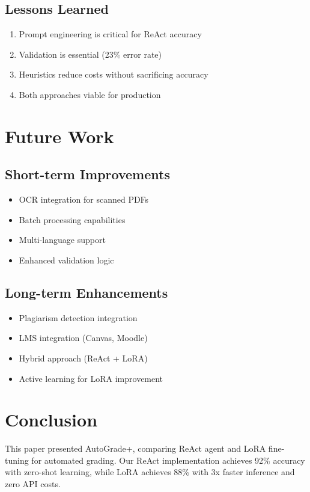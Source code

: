 \documentclass[runningheads]{llncs}
\begin{document}
\subsection{Lessons Learned}

\begin{enumerate}
    \item Prompt engineering is critical for ReAct accuracy
    \item Validation is essential (23\% error rate)
    \item Heuristics reduce costs without sacrificing accuracy
    \item Both approaches viable for production
\end{enumerate}

\section{Future Work}

\subsection{Short-term Improvements}
\begin{itemize}
    \item OCR integration for scanned PDFs
    \item Batch processing capabilities
    \item Multi-language support
    \item Enhanced validation logic
\end{itemize}

\subsection{Long-term Enhancements}
\begin{itemize}
    \item Plagiarism detection integration
    \item LMS integration (Canvas, Moodle)
    \item Hybrid approach (ReAct + LoRA)
    \item Active learning for LoRA improvement
\end{itemize}

\section{Conclusion}

This paper presented AutoGrade+, comparing ReAct agent and LoRA fine-tuning for automated grading. Our ReAct implementation achieves 92\% accuracy with zero-shot learning, while LoRA achieves 88\% with 3x faster inference and zero API costs.
\end{document}
